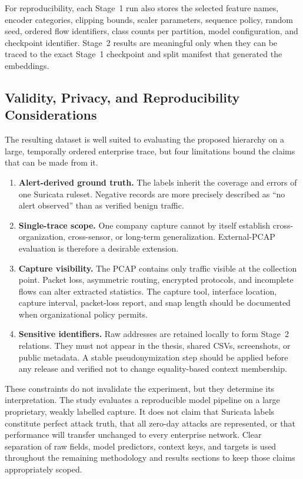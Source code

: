 For reproducibility, each Stage~1 run also stores the selected feature names,
encoder categories, clipping bounds, scaler parameters, sequence policy,
random seed, ordered flow identifiers, class counts per partition, model
configuration, and checkpoint identifier. Stage~2 results are meaningful only
when they can be traced to the exact Stage~1 checkpoint and split manifest that
generated the embeddings.

\subsection{Validity, Privacy, and Reproducibility Considerations}
\label{subsec:dataset_limitations}

The resulting dataset is well suited to evaluating the proposed hierarchy on
a large, temporally ordered enterprise trace, but four limitations bound the
claims that can be made from it.

\begin{enumerate}[label=\textbf{L\arabic*:},leftmargin=*]
    \item \textbf{Alert-derived ground truth.} The labels inherit the coverage
    and errors of one Suricata ruleset. Negative records are more precisely
    described as ``no alert observed'' than as verified benign traffic.

    \item \textbf{Single-trace scope.} One company capture cannot by itself
    establish cross-organization, cross-sensor, or long-term generalization.
    External-PCAP evaluation is therefore a desirable extension.

    \item \textbf{Capture visibility.} The PCAP contains only traffic visible
    at the collection point. Packet loss, asymmetric routing, encrypted
    protocols, and incomplete flows can alter extracted statistics. The
    capture tool, interface location, capture interval, packet-loss report, and
    snap length should be documented when organizational policy permits.

    \item \textbf{Sensitive identifiers.} Raw addresses are retained locally
    to form Stage~2 relations. They must not appear in the thesis, shared CSVs,
    screenshots, or public metadata. A stable pseudonymization step should be
    applied before any release and verified not to change equality-based
    context membership.
\end{enumerate}

These constraints do not invalidate the experiment, but they determine its
interpretation. The study evaluates a reproducible model pipeline on a large
proprietary, weakly labelled capture. It does not claim that Suricata labels
constitute perfect attack truth, that all zero-day attacks are represented, or
that performance will transfer unchanged to every enterprise network. Clear
separation of raw fields, model predictors, context keys, and targets is used
throughout the remaining methodology and results sections to keep those claims
appropriately scoped.
